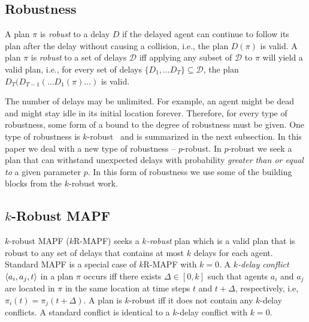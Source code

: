 \documentclass{article}
\newcommand{\krmapf}{$k$R-MAPF\xspace}
\newcommand\Roni[1]{\nb{\textbf{Roni:}}{orange}{#1}}
\begin{document}
   
 \subsection{Robustness}
 
 A plan $\pi$ is \emph{robust} to a delay $D$ if the delayed agent can continue to follow its plan after the delay without causing a collision, i.e., the plan $D(\pi)$ is valid. %
 A plan $\pi$ is {\em robust} to a set of delays $\mathcal{D}$ iff applying any subset of $\mathcal{D}$ to $\pi$ will yield a valid plan, i.e., for every set of delays $\{D_1,\ldots D_T\}\subseteq \mathcal{D}$,  the plan $D_T(D_{T-1}(\ldots D_1(\pi)\ldots )$ is valid. %
 
 The number of delays may be unlimited. For example, an agent might be dead and might stay idle in its initial location forever. Therefore, for every type of robustness, some form of a bound to the degree of robustness must be given.  One type of robustness is $k$-robust~\cite{DBLP:conf/socs/AtzmonSFWBZ18} and is summarized in the next subsection. In this paper we deal with a new type of robustness -- $p$-robust. In $p$-robust we seek a plan that can withstand unexpected delays with probability {\em greater than or equal to} a given parameter $p$. In this form of robustness we use some of the building blocks from the $k$-robust work. 
 
\subsection{\texorpdfstring{$k$}--Robust MAPF}

$k$-robust MAPF (\krmapf) seeks a  {\em $k$-robust} plan which is a valid plan that is robust to any set of delays that contains at most $k$ delays for each agent. Standard MAPF is a special case of \krmapf{} with $k=0$.  A {\em $k$-delay conflict} $\left \langle a_i,a_j,t \right \rangle $ in a plan $\pi$ occurs iff there exists $\Delta\in[0,k]$ such that agents $a_i$ and $a_j$ are located in $\pi$ in the same location at time
steps $t$ and $t+\Delta$, respectively, i.e, $\pi_i(t) = \pi_j(t+\Delta)$. A plan is $k$-robust iff it does not contain 
any $k$-delay conflicts. A standard conflict is identical to a $k$-delay conflict with $k=0$. 


\end{document}
